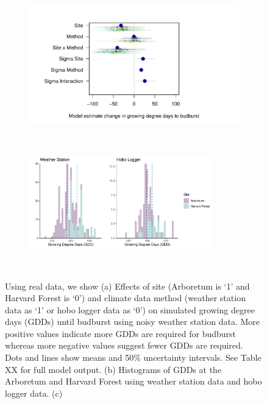 \documentclass{article}\usepackage[]{graphicx}\usepackage[]{color}
\begin{document}
\begin{figure}[H]
  \begin{subfigure}{.5\linewidth}
    \caption{}
    \centering
    \includegraphics[height=7cm, width=11cm]{..//analyses/figures/muplot_urban_real.pdf}
    \label{fig:muplotreal}
  \end{subfigure}%
    \begin{subfigure}{.5\linewidth}
      \caption{}
      \centering
      \includegraphics[height=4cm, width=8cm]{..//analyses/figures/gdd_methods_real.pdf}
    \label{fig:gddreal}
  \end{subfigure}\\[1ex]
\caption{ Using real data, we show (a) Effects of site (Arboretum is `1' and Harvard Forest is `0') and climate data method (weather station data as `1' or hobo logger data as `0') on simulated growing degree days (GDDs) until budburst using noisy weather station data. More positive values indicate more GDDs are required for budburst whereas more negative values suggest fewer GDDs are required. Dots and lines show means and 50\% uncertainty intervals. See Table XX for full model output. (b) Histograms of GDDs at the Arboretum and Harvard Forest using weather station data and hobo logger data. (c) }
\label{fig:real}
\end{figure}
\end{document}
